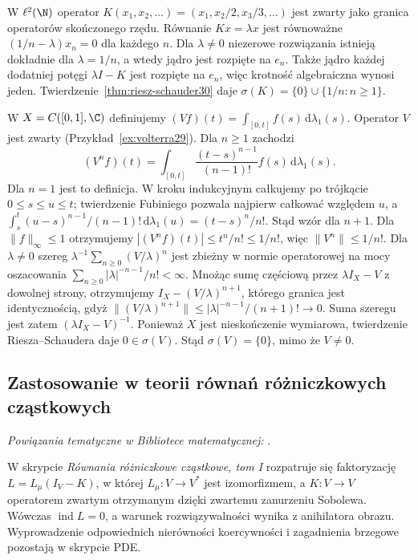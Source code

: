 \begin{przyklad}
\label{ex:diagonal-spectrum30}
W $\ell^2(\N)$ operator
$K(x_1,x_2,\ldots)=(x_1,x_2/2,x_3/3,\ldots)$
jest zwarty jako granica operatorów skończonego rzędu.
Równanie $Kx=\lambda x$ jest równoważne
$(1/n-\lambda)x_n=0$ dla każdego $n$.
Dla $\lambda\ne0$ niezerowe rozwiązania istnieją dokładnie
dla $\lambda=1/n$, a wtedy jądro jest rozpięte na $e_n$.
Także jądro każdej dodatniej potęgi $\lambda I-K$ jest
rozpięte na $e_n$, więc krotność algebraiczna wynosi jeden.
Twierdzenie~\ref{thm:riesz-schauder30} daje
$\sigma(K)=\{0\}\cup\{1/n:n\ge1\}$.
\end{przyklad}

\begin{przyklad}
\label{ex:volterra-spectrum30}
W $X=C([0,1],\C)$ definiujemy
$(Vf)(t)=\int_{[0,t]}f(s)\,\mathrm d\lambda_1(s)$.
Operator $V$ jest zwarty (Przykład~\ref{ex:volterra29}).
Dla $n\ge1$ zachodzi
\[
(V^nf)(t)=\int_{[0,t]}\frac{(t-s)^{n-1}}{(n-1)!}
 f(s)\,\mathrm d\lambda_1(s).
\]
Dla $n=1$ jest to definicja. W kroku indukcyjnym
całkujemy po trójkącie $0\le s\le u\le t$; twierdzenie
Fubiniego pozwala najpierw całkować względem $u$,
a $\int_s^t (u-s)^{n-1}/(n-1)!\,\mathrm d\lambda_1(u)
=(t-s)^n/n!$. Stąd wzór dla $n+1$.
Dla $\|f\|_\infty\le1$ otrzymujemy
$|(V^nf)(t)|\le t^n/n!\le1/n!$, więc $\|V^n\|\le1/n!$.
Dla $\lambda\ne0$ szereg
$\lambda^{-1}\sum_{n\ge0}(V/\lambda)^n$
jest zbieżny w normie operatorowej na mocy oszacowania
$\sum_{n\ge0}|\lambda|^{-n-1}/n!<\infty$.
Mnożąc sumę częściową przez $\lambda I_X-V$ z dowolnej
strony, otrzymujemy $I_X-(V/\lambda)^{n+1}$, którego
granica jest identycznością, gdyż
$\|(V/\lambda)^{n+1}\|\le|\lambda|^{-n-1}/(n+1)!\to0$.
Suma szeregu jest zatem $(\lambda I_X-V)^{-1}$.
Ponieważ $X$ jest nieskończenie wymiarowa, twierdzenie
Riesza--Schaudera daje $0\in\sigma(V)$. Stąd $\sigma(V)=\{0\}$,
mimo że $V\ne0$.
\end{przyklad}

\subsection{Zastosowanie w teorii równań różniczkowych cząstkowych}

\noindent\emph{Powiązania tematyczne w Bibliotece matematycznej:} .


\begin{uwaga}
\label{rem:elliptic-fredholm30}
W skrypcie \emph{Równania różniczkowe cząstkowe, tom I}
rozpatruje się faktoryzację $L=L_\mu(I_V-K)$,
w której $L_\mu:V\to V^*$ jest izomorfizmem,
a $K:V\to V$ operatorem zwartym otrzymanym dzięki
zwartemu zanurzeniu Sobolewa. Wówczas $\operatorname{ind}L=0$,
a warunek rozwiązywalności wynika z anihilatora obrazu.
Wyprowadzenie odpowiednich nierówności koercywności
i zagadnienia brzegowe pozostają w skrypcie PDE.
\end{uwaga}
